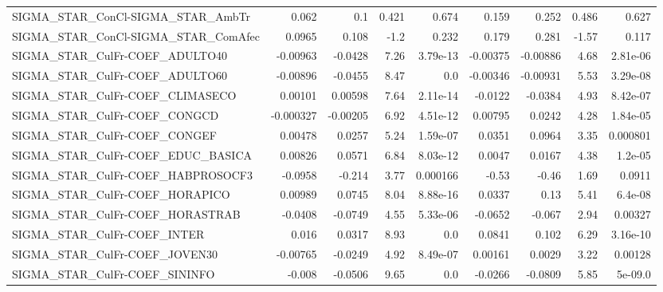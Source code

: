 \begin{tabular}{lrrrrrrrr}
SIGMA\_STAR\_ConCl-SIGMA\_STAR\_AmbTr      &       0.062 &          0.1 &    0.421 &    0.674 &      0.159 &       0.252 &        0.486 &         0.627 \\
SIGMA\_STAR\_ConCl-SIGMA\_STAR\_ComAfec    &      0.0965 &        0.108 &     -1.2 &    0.232 &      0.179 &       0.281 &        -1.57 &         0.117 \\
SIGMA\_STAR\_CulFr-COEF\_ADULTO40         &    -0.00963 &      -0.0428 &     7.26 & 3.79e-13 &   -0.00375 &    -0.00886 &         4.68 &      2.81e-06 \\
SIGMA\_STAR\_CulFr-COEF\_ADULTO60         &    -0.00896 &      -0.0455 &     8.47 &      0.0 &   -0.00346 &    -0.00931 &         5.53 &      3.29e-08 \\
SIGMA\_STAR\_CulFr-COEF\_CLIMASECO        &     0.00101 &      0.00598 &     7.64 & 2.11e-14 &    -0.0122 &     -0.0384 &         4.93 &      8.42e-07 \\
SIGMA\_STAR\_CulFr-COEF\_CONGCD           &   -0.000327 &     -0.00205 &     6.92 & 4.51e-12 &    0.00795 &      0.0242 &         4.28 &      1.84e-05 \\
SIGMA\_STAR\_CulFr-COEF\_CONGEF           &     0.00478 &       0.0257 &     5.24 & 1.59e-07 &     0.0351 &      0.0964 &         3.35 &      0.000801 \\
SIGMA\_STAR\_CulFr-COEF\_EDUC\_BASICA      &     0.00826 &       0.0571 &     6.84 & 8.03e-12 &     0.0047 &      0.0167 &         4.38 &       1.2e-05 \\
SIGMA\_STAR\_CulFr-COEF\_HABPROSOCF3      &     -0.0958 &       -0.214 &     3.77 & 0.000166 &      -0.53 &       -0.46 &         1.69 &        0.0911 \\
SIGMA\_STAR\_CulFr-COEF\_HORAPICO         &     0.00989 &       0.0745 &     8.04 & 8.88e-16 &     0.0337 &        0.13 &         5.41 &       6.4e-08 \\
SIGMA\_STAR\_CulFr-COEF\_HORASTRAB        &     -0.0408 &      -0.0749 &     4.55 & 5.33e-06 &    -0.0652 &      -0.067 &         2.94 &       0.00327 \\
SIGMA\_STAR\_CulFr-COEF\_INTER            &       0.016 &       0.0317 &     8.93 &      0.0 &     0.0841 &       0.102 &         6.29 &      3.16e-10 \\
SIGMA\_STAR\_CulFr-COEF\_JOVEN30          &    -0.00765 &      -0.0249 &     4.92 & 8.49e-07 &    0.00161 &      0.0029 &         3.22 &       0.00128 \\
SIGMA\_STAR\_CulFr-COEF\_SININFO          &      -0.008 &      -0.0506 &     9.65 &      0.0 &    -0.0266 &     -0.0809 &         5.85 &       5e-09.0 \\

\end{tabular}
